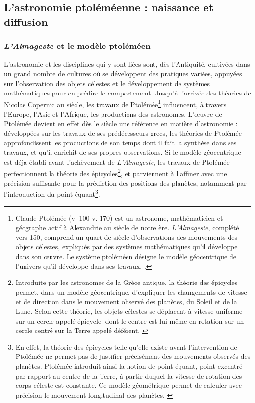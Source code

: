 
\subsection{L’astronomie ptoléméenne : naissance et diffusion}
    \subsubsection{\textit{L'Almageste} et le modèle ptoléméen}
	L'astronomie et les disciplines qui y sont liées sont, dès l'Antiquité, cultivées dans un grand nombre de cultures où se développent des pratiques variées, appuyées sur l'observation des objets célestes et le développement de systèmes mathématiques pour en prédire le comportement. Jusqu'à l'arrivée des théories de Nicolas Copernic au \xv siècle, les travaux de Ptolémée\footnote{Claude Ptolémée (v. 100-v. 170) est un astronome, mathématicien et géographe actif à Alexandrie au \ii siècle de notre ère. \textit{L'Almageste}, complété vers 150, comprend un quart de siècle d'observations des mouvements des objets célestes, expliqués par des systèmes mathématiques qu'il développe dans son œuvre. Le système ptoléméen désigne le modèle géocentrique de l'univers qu'il développe dans ses travaux. \cite{jonesPtolemya}.} influencent, à travers l'Europe, l'Asie et l'Afrique, les productions des astronomes. L'œuvre de Ptolémée devient en effet dès le \ii siècle une référence en matière d'astronomie : développées sur les travaux de ses prédécesseurs grecs, les théories de Ptolémée approfondissent les productions de son temps dont il fait la synthèse dans ses travaux, et qu'il enrichit de ses propres observations. Si le modèle géocentrique est déjà établi avant l'achèvement de \textit{L'Almageste}, les travaux de Ptolémée perfectionnent la théorie des épicycles\footnote{Introduite par les astronomes de la Grèce antique, la théorie des épicycles permet, dans un modèle géocentrique, d'expliquer les changements de vitesse et de direction dans le mouvement observé des planètes, du Soleil et de la Lune. Selon cette théorie, les objets célestes se déplacent à vitesse uniforme sur un cercle appelé épicycle, dont le centre est lui-même en rotation sur un cercle centré sur la Terre appelé déférent. \cite{rousseauEpicyclesPtolemee}}, et parviennent à l'affiner avec une précision suffisante pour la prédiction des positions des planètes, notamment par l'introduction du point équant\footnote{En effet, la théorie des épicycles telle qu'elle existe avant l'intervention de Ptolémée ne permet pas de justifier précisément des mouvements observés des planètes. Ptolémée introduit ainsi la notion de point équant, point excentré par rapport au centre de la Terre, à partir duquel la vitesse de rotation des corps céleste est constante. Ce modèle géométrique permet de calculer avec précision le mouvement longitudinal des planètes. \cite{evansHistoryAstronomy}}.
	
